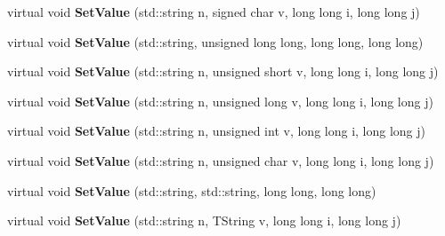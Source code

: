 \begin{DoxyCompactItemize}
\item 
\hypertarget{class_h_a_l_1_1_analysis_data_aee73bb81d185aa2780a80257f9c3ea3f}{virtual void {\bfseries Set\-Value} (std\-::string n, signed char v, long long i, long long j)}\label{class_h_a_l_1_1_analysis_data_aee73bb81d185aa2780a80257f9c3ea3f}

\item 
\hypertarget{class_h_a_l_1_1_analysis_data_a99a34664abcb8d9077ab7506edf1b2d2}{virtual void {\bfseries Set\-Value} (std\-::string, unsigned long long, long long, long long)}\label{class_h_a_l_1_1_analysis_data_a99a34664abcb8d9077ab7506edf1b2d2}

\item 
\hypertarget{class_h_a_l_1_1_analysis_data_a1605769615c1251e6ea758967fad6f05}{virtual void {\bfseries Set\-Value} (std\-::string n, unsigned short v, long long i, long long j)}\label{class_h_a_l_1_1_analysis_data_a1605769615c1251e6ea758967fad6f05}

\item 
\hypertarget{class_h_a_l_1_1_analysis_data_a168eaaecfd16e8354f7b5bdddb16191e}{virtual void {\bfseries Set\-Value} (std\-::string n, unsigned long v, long long i, long long j)}\label{class_h_a_l_1_1_analysis_data_a168eaaecfd16e8354f7b5bdddb16191e}

\item 
\hypertarget{class_h_a_l_1_1_analysis_data_ad97fdd3d4a207986287ff69d39aaae66}{virtual void {\bfseries Set\-Value} (std\-::string n, unsigned int v, long long i, long long j)}\label{class_h_a_l_1_1_analysis_data_ad97fdd3d4a207986287ff69d39aaae66}

\item 
\hypertarget{class_h_a_l_1_1_analysis_data_a113b53bd65c12f201f91cc95824d3095}{virtual void {\bfseries Set\-Value} (std\-::string n, unsigned char v, long long i, long long j)}\label{class_h_a_l_1_1_analysis_data_a113b53bd65c12f201f91cc95824d3095}

\item 
\hypertarget{class_h_a_l_1_1_analysis_data_a32d6e015cd6fe460dbbdcc3c01ba0962}{virtual void {\bfseries Set\-Value} (std\-::string, std\-::string, long long, long long)}\label{class_h_a_l_1_1_analysis_data_a32d6e015cd6fe460dbbdcc3c01ba0962}

\item 
\hypertarget{class_h_a_l_1_1_analysis_data_a340b0f2b322fd8b8737396dfa9277555}{virtual void {\bfseries Set\-Value} (std\-::string n, T\-String v, long long i, long long j)}\label{class_h_a_l_1_1_analysis_data_a340b0f2b322fd8b8737396dfa9277555}


\end{DoxyCompactItemize}
